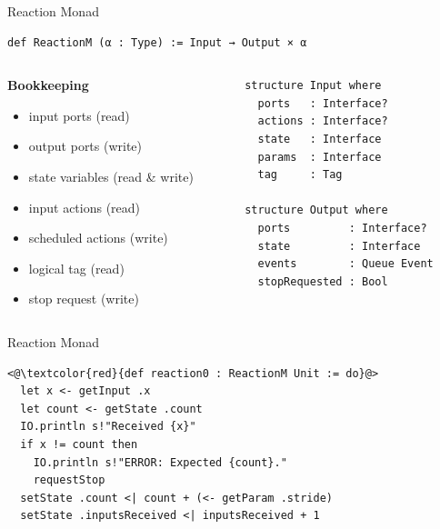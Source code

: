 \documentclass[aspectratio=169]{beamer}
\begin{document}

\begin{frame}[fragile]{Reaction Monad}

\vspace{4mm}

\begin{lstlisting}
def ReactionM (α : Type) := Input → Output × α
\end{lstlisting}

\pause

\begin{columns}[onlytextwidth]

\begin{column}{0.4\textwidth}
\textbf{Bookkeeping}
\begin{itemize}
  \item input ports (read)
  \item output ports (write)
  \item state variables (read \& write)
  \item input actions (read) 
  \item scheduled actions (write) 
  \item logical tag (read)
  \item stop request (write)
\end{itemize}
\end{column}

\pause

\begin{column}{0.5\textwidth}
\begin{lstlisting}
structure Input where
  ports   : Interface?
  actions : Interface?
  state   : Interface 
  params  : Interface 
  tag     : Tag

structure Output where
  ports         : Interface?
  state         : Interface
  events        : Queue Event
  stopRequested : Bool       
\end{lstlisting}
\end{column}

\end{columns}

\end{frame}


\begin{frame}[fragile]{Reaction Monad}
\begin{lstlisting}
<@\textcolor{red}{def reaction0 : ReactionM Unit := do}@>
  let x <- getInput .x
  let count <- getState .count
  IO.println s!"Received {x}"  
  if x != count then
    IO.println s!"ERROR: Expected {count}."
    requestStop
  setState .count <| count + (<- getParam .stride)
  setState .inputsReceived <| inputsReceived + 1
\end{lstlisting}  
\end{frame}
\end{document}
